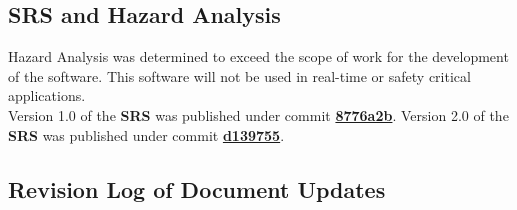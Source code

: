 \documentclass{article}
\begin{document}

\subsection{SRS and Hazard Analysis}
Hazard Analysis was determined to exceed the scope of work for the development of the \progname{} software. This software will not be used in real-time or safety critical applications.\\ 

\noindent Version 1.0 of the \textbf{SRS} was published under commit \href{https://github.com/KiranSingh15/CAS-741-Image-Correspondences/commit/8776a2b2180b8d8d170e9e1b7e68392f4b424092#diff-135354e346cf609e826d36a28ad63746a7c537c4fcc1dec1663b35a4af2355f9}{\textbf{8776a2b}}. Version 2.0 of the \textbf{SRS} was published under commit \href{https://github.com/KiranSingh15/CAS-741-Image-Correspondences/commit/d139755d96b3c7b316cd7f96106ef69df3ab228a}{\textbf{d139755}}. 

\subsection*{Revision Log of Document Updates}
\end{document}
